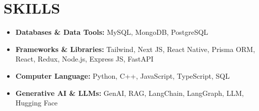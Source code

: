 \section*{SKILLS}
\begin{itemize}[leftmargin=1.4em,itemsep=1pt,topsep=2pt,parsep=0pt]
  \item \textbf{Databases \& Data Tools:} MySQL, MongoDB, PostgreSQL
  \item \textbf{Frameworks \& Libraries:} Tailwind, Next JS, React Native, Prisma ORM, React, Redux, Node.js, Express JS, FastAPI
  \item \textbf{Computer Language:} Python, C++, JavaScript, TypeScript, SQL
  \item \textbf{Generative AI \& LLMs:} GenAI, RAG, LangChain, LangGraph, LLM, Hugging Face
\end{itemize}
